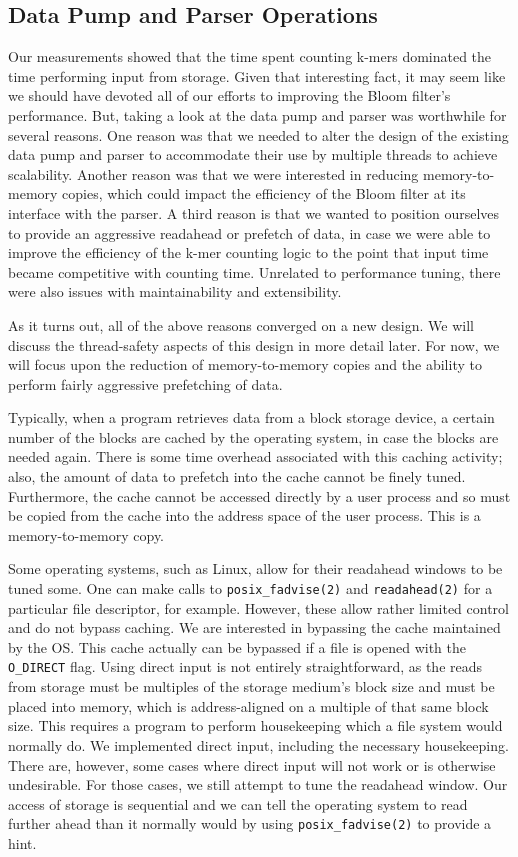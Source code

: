 \documentclass{article}
\begin{document}
\subsection{Data Pump and Parser Operations}

Our measurements showed that the time spent counting k-mers dominated the time
performing input from storage. Given that interesting fact, it may seem like we
should have devoted all of our efforts to improving the Bloom filter's
performance. But, taking a look at the data pump and parser was worthwhile for
several reasons. One reason was that we needed to alter the design of the
existing data pump and parser to accommodate their use by multiple threads to
achieve scalability. Another reason was that we were interested in reducing
memory-to-memory copies, which could impact the efficiency of the Bloom filter
at its interface with the parser. A third reason is that we wanted to position
ourselves to provide an aggressive readahead or prefetch of data, in case we
were able to improve the efficiency of the k-mer counting logic to the point
that input time became competitive with counting time. Unrelated to performance
tuning, there were also issues with maintainability and extensibility.

As it turns out, all of the above reasons converged on a new design. We will
discuss the thread-safety aspects of this design in more detail later. For now,
we will focus upon the reduction of memory-to-memory copies and the ability to
perform fairly aggressive prefetching of data.

Typically, when a program retrieves data from a block storage device, a certain
number of the blocks are cached by the operating system, in case the blocks are
needed again. There is some time overhead associated with this caching
activity; also, the amount of data to prefetch into the cache cannot be finely
tuned. Furthermore, the cache cannot be accessed directly by a user process and
so must be copied from the cache into the address space of the user process.
This is a memory-to-memory copy. 

Some operating systems, such as Linux, allow for their readahead windows to be
tuned some. One can make calls to \texttt{posix\_fadvise(2)} and
\texttt{readahead(2)} for a particular file descriptor, for example. However,
these allow rather limited control and do not bypass caching. We are interested
in bypassing the cache maintained by the OS. This cache actually can be
bypassed if a file is opened with the \texttt{O\_DIRECT} flag. Using direct
input is not entirely straightforward, as the reads from storage must be
multiples of the storage medium's block size and must be placed into memory,
which is address-aligned on a multiple of that same block size. This requires a
program to perform housekeeping which a file system would normally do. We
implemented direct input, including the necessary housekeeping. There are,
however, some cases where direct input will not work or is otherwise
undesirable. For those cases, we still attempt to tune the readahead window.
Our access of storage is sequential and we can tell the operating system to
read further ahead than it normally would by using \texttt{posix\_fadvise(2)}
to provide a hint.
\end{document}
